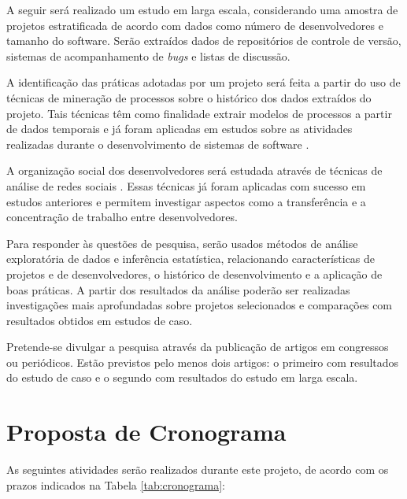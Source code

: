 \documentclass{article}
\begin{document}
A seguir será realizado um estudo em larga escala, considerando uma amostra de
projetos estratificada de acordo com dados como número de desenvolvedores e
tamanho do software. Serão extraídos dados de repositórios de controle de
versão, sistemas de acompanhamento de \emph{bugs} e listas de discussão.

A identificação das práticas adotadas por um projeto será feita a partir do uso
de técnicas de mineração de processos \cite{aalst2004} sobre o histórico dos
dados extraídos do projeto. Tais técnicas têm como finalidade extrair modelos de
processos a partir de dados temporais e já foram aplicadas em estudos sobre as
atividades realizadas durante o desenvolvimento de sistemas de software
\cite{rubin2007}.

A organização social dos desenvolvedores será estudada através de técnicas de
análise de redes sociais \cite{newman2003}. Essas técnicas já foram aplicadas
com sucesso em estudos anteriores \cite{crowston2005} e permitem investigar
aspectos como a transferência e a concentração de trabalho entre
desenvolvedores. 

Para responder às questões de pesquisa, serão usados métodos de análise
exploratória de dados e inferência estatística, relacionando características de
projetos e de desenvolvedores, o histórico de desenvolvimento e a aplicação de
boas práticas. A partir dos resultados da análise poderão ser realizadas
investigações mais aprofundadas sobre projetos selecionados e comparações com
resultados obtidos em estudos de caso.

Pretende-se divulgar a pesquisa através da publicação de artigos em congressos
ou periódicos. Estão previstos pelo menos dois artigos: o primeiro com
resultados do estudo de caso e o segundo com resultados do estudo em larga
escala.


\section{Proposta de Cronograma}
\newcommand{\newrow}{\\\hline}
\newcommand{\x}{$\bullet$}

As seguintes atividades serão realizados durante este projeto, de acordo com os
prazos indicados na Tabela \ref{tab:cronograma}:
\end{document}
